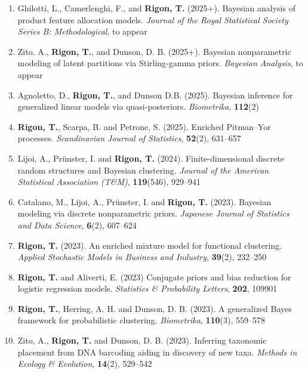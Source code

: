 \documentclass[10pt]{article}
\begin{document}
\begin{enumerate}

\item Ghilotti, L., Camerlenghi, F., and \textbf{Rigon, T.} (2025+). Bayesian analysis of product feature allocation models. \textit{Journal of the Royal Statistical Society Series B: Methodological}, to appear


\item Zito, A., \textbf{Rigon, T.}, and Dunson, D. B. (2025+). Bayesian nonparametric modeling of latent partitions via Stirling-gamma priors. \textit{Bayesian Analysis}, to appear

\item Agnoletto, D., \textbf{Rigon, T.}, and Dunson D.B. (2025). Bayesian inference for generalized linear models via quasi-posteriors. \emph{Biometrika}, \textbf{112}(2)

\item \textbf{Rigon, T.}, Scarpa, B. and Petrone, S. (2025). Enriched Pitman--Yor processes. \textit{Scandinavian Journal of Statistics}, \textbf{52}(2), 631--657

\item Lijoi, A., Pr\"unster, I. and \textbf{Rigon, T.} (2024). Finite-dimensional discrete random structures and Bayesian clustering. \textit{Journal of the American Statistical Association (T\&M)}, \textbf{119}(546), 929--941

\item Catalano, M., Lijoi, A., Pr\"unster, I. and \textbf{Rigon, T.} (2023). Bayesian modeling via discrete nonparametric priors. \textit{Japanese Journal of Statistics and Data Science}, \textbf{6}(2), 607--624

\item \textbf{Rigon, T.} (2023). An enriched mixture model for functional clustering. \emph{Applied Stochastic Models in Business and Industry}, \textbf{39}(2), 232--250

\item \textbf{Rigon, T.} and Aliverti, E. (2023) Conjugate priors and bias reduction for logistic regression models. \textit{Statistics \& Probability Letters}, \textbf{202}, 109901

\item \textbf{Rigon, T.}, Herring, A. H. and Dunson, D. B. (2023). A generalized Bayes framework for probabilistic clustering. \textit{Biometrika}, \textbf{110}(3), 559--578

\item Zito, A., \textbf{Rigon, T.} and Dunson, D. B. (2023). Inferring taxonomic placement from DNA barcoding aiding in discovery of new taxa. \emph{Methods in Ecology \& Evolution}, \textbf{14}(2), 529--542


\end{enumerate}
\end{document}
